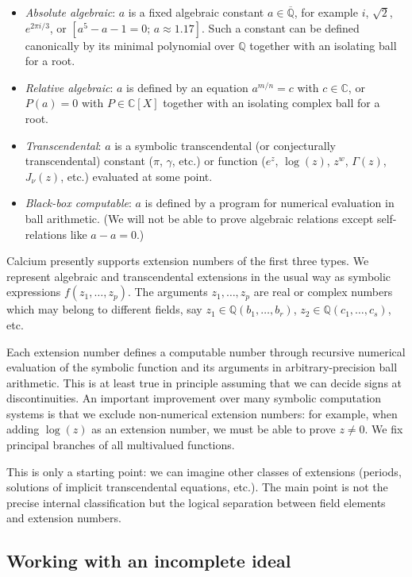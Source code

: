 \documentclass[11pt,a4paper]{article}
\begin{document}
\begin{itemize}
\item \emph{Absolute algebraic}: $a$ is a fixed algebraic constant $a \in \overline{\mathbb{Q}}$, for example
$i$, $\sqrt{2}$, $e^{2 \pi i / 3}$, or $[a^5-a-1=0; \, a\approx 1.17]$.
Such a constant can be defined canonically by its
minimal polynomial over $\mathbb{Q}$ together with an isolating
ball for a root.
\item \emph{Relative algebraic}: $a$ is defined by an equation $a^{m/n} = c$ with $c \in \mathbb{C}$, or $P(a) = 0$ with $P \in \mathbb{C}[X]$ together with an isolating complex ball for a root.
\item \emph{Transcendental}: $a$ is a symbolic transcendental (or conjecturally transcendental)
constant ($\pi$, $\gamma$, etc.) or function
($e^z$, $\log(z)$, $z^w$, $\Gamma(z)$, $J_{\nu}(z)$, etc.) evaluated at some point.
\item \emph{Black-box computable}: $a$ is defined by a program for numerical evaluation in ball arithmetic. (We will not be able to prove algebraic relations
except self-relations like $a - a = 0$.)
\end{itemize}

Calcium presently supports extension numbers of the first three types.
We represent algebraic and transcendental extensions
in the usual way as symbolic expressions $f(z_1,\ldots,z_p)$.
The arguments $z_1, \ldots, z_p$ are real or complex numbers
which may belong to different fields, say $z_1 \in \mathbb{Q}(b_1,\ldots,b_r)$,
$z_2 \in \mathbb{Q}(c_1,\ldots,c_s)$, etc.

Each extension number defines a computable number
through recursive numerical evaluation of the symbolic function
and its arguments in arbitrary-precision ball arithmetic.
This is at least true in principle
assuming that we can decide signs at discontinuities.
An important improvement
over many symbolic computation systems
is that we exclude non-numerical extension numbers: for example,
when adding $\log(z)$ as an extension number, we must be
able to prove $z \ne 0$.
We fix principal branches of all multivalued functions.

This is only a starting point: we can imagine other classes of extensions (periods, solutions of
implicit transcendental equations, etc.).
The main point
is not the precise internal classification but the
logical separation between field elements
and extension numbers.

\subsection{Working with an incomplete ideal}
\end{document}
